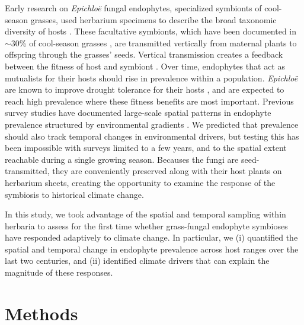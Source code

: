 \documentclass[11pt]{article}
\begin{document}
Early research on \emph{Epichloë} fungal endophytes, specialized symbionts of cool-season grasses, used herbarium specimens to describe the broad taxonomic diversity of hosts \citep{white1985endophyte}. 
These facultative symbionts, which have been documented in $\sim 30$\% of cool-season grasses \citep{leuchtmann1992systematics}, are transmitted vertically from maternal plants to offspring through the grasses' seeds.
Vertical transmission creates a feedback between the fitness of host and symbiont \citep{fine1975vectors, douglas1998host, rudgers2009fungus}. 
Over time, endophytes that act as mutualists for their hosts should rise in prevalence within a population. 
\emph{Epichloë} are known to improve drought tolerance for their hosts \citep{afkhami2014mutualist}, and are expected to reach high prevalence where these fitness benefits are most important.
Previous survey studies have documented large-scale spatial patterns in  endophyte prevalence structured by environmental gradients \citep{granath2007variation,bazely2007broad, afkhami2012fungal,sneck2017variation}.
We predicted that prevalence should also track temporal changes in environmental drivers, but testing this has been impossible with surveys limited to a few years, and to the spatial extent reachable during a single growing season. 
Becauses the fungi are seed-transmitted, they are conveniently preserved along with their host plants on herbarium sheets, creating the opportunity to examine the response of the symbiosis to historical climate change.

In this study, we took advantage of the spatial and temporal sampling within herbaria to assess for the first time whether grass-fungal endophyte symbioses have responded adaptively to climate change. In particular, we (i) quantified the spatial and temporal change in endophyte prevalence across host ranges over the last two centuries, and (ii) identified climate drivers that can explain the magnitude of these responses.
	
\section*{Methods}
\end{document}
